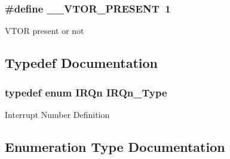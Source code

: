 \subsubsection[{\+\_\+\+\_\+\+V\+T\+O\+R\+\_\+\+P\+R\+E\+S\+E\+N\+T}]{\setlength{\rightskip}{0pt plus 5cm}\#define \+\_\+\+\_\+\+V\+T\+O\+R\+\_\+\+P\+R\+E\+S\+E\+N\+T~1}\label{group___s_a_m_l21_g18_a__cmsis_gaddbae1a1b57539f398eb5546a17de8f6}
V\+T\+O\+R present or not 

\subsection{Typedef Documentation}
\hypertarget{group___s_a_m_l21_g18_a__cmsis_gac3af4a32370fb28c4ade8bf2add80251}{}
\subsubsection[{I\+R\+Qn\+\_\+\+Type}]{\setlength{\rightskip}{0pt plus 5cm}typedef enum {\bf I\+R\+Qn}  {\bf I\+R\+Qn\+\_\+\+Type}}\label{group___s_a_m_l21_g18_a__cmsis_gac3af4a32370fb28c4ade8bf2add80251}
Interrupt Number Definition 

\subsection{Enumeration Type Documentation}
\hypertarget{group___s_a_m_l21_g18_a__cmsis_ga666eb0caeb12ec0e281415592ae89083}{}
